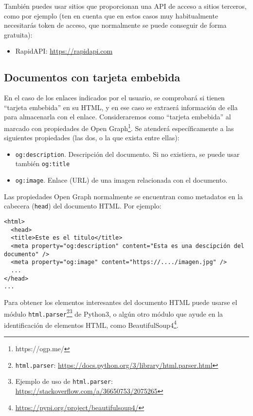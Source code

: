 También puedes usar sitios que proporcionan una API de acceso a sitios terceros, como por ejemplo (ten en cuenta que en estos casos muy habitualmente necesitarás token de acceso, que normalmente se puede conseguir de forma gratuita):

\begin{itemize}
\item RapidAPI: \url{https://rapidapi.com}
\end{itemize}

\subsection{Documentos con tarjeta embebida}
\label{sec:practica-final-2022-05:tarjeta}

En el caso de los enlaces indicados por el usuario, se comprobará si tienen ``tarjeta embebida'' en su HTML, y en ese caso se extraerá información de ella para almacenarla con el enlace. Consideraremos como ``tarjeta embebida'' al marcado con propiedades de Open Graph\footnote{https://ogp.me/}. Se atenderá específicamente a las siguientes propiedades (las dos, o la que exista entre ellas):

\begin{itemize}
\item \texttt{og:description}. Descripción del documento. Si no existiera, se puede usar también \texttt{og:title}
\item \texttt{og:image}. Enlace (URL) de una imagen relacionada con el documento.
\end{itemize}

Las propiedades Open Graph normalmente se encuentran como metadatos en la cabecera (\texttt{head}) del documento HTML. Por ejemplo:

\begin{verbatim}
<html>
  <head>
  <title>Este es el titulo</title>
  <meta property="og:description" content="Esta es una descipción del documento" />
  <meta property="og:image" content="https://..../imagen.jpg" />
  ...
</head>
...
\end{verbatim}

Para obtener los elementos interesantes del documento HTML puede usarse el módulo \texttt{html.parser}\footnote{\texttt{html.parser}: \url{https://docs.python.org/3/library/html.parser.html}}\footnote{Ejemplo de uso de \texttt{html.parser}: \url{https://stackoverflow.com/a/36650753/2075265}} de Python3, o algún otro módulo que ayude en la identificación de elementos HTML, como BeautifulSoup4\footnote{\url{https://pypi.org/project/beautifulsoup4/}}.

